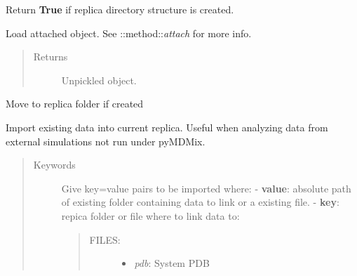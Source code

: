 \documentclass[letterpaper,10pt,english]{sphinxmanual}
\begin{document}
\begin{fulllineitems}

\begin{fulllineitems}
\label{replicas:pyMDMix.Replicas.Replica.folderscreated}
Return \textbf{True} if replica directory structure is created.

\end{fulllineitems}


\begin{fulllineitems}
\label{replicas:pyMDMix.Replicas.Replica.getAttached}
Load attached object. See ::method::\emph{attach} for more info.
\begin{quote}\begin{description}
\item[{Returns}] \leavevmode
Unpickled object.

\end{description}\end{quote}

\end{fulllineitems}


\begin{fulllineitems}
\label{replicas:pyMDMix.Replicas.Replica.go}
Move to replica folder if created

\end{fulllineitems}


\begin{fulllineitems}
\label{replicas:pyMDMix.Replicas.Replica.importData}
Import existing data into current replica. Useful when analyzing data from external simulations
not run under pyMDMix.
\begin{quote}\begin{description}
\item[{Keywords}] \leavevmode
Give key=value pairs to be imported where:
- \textbf{value}: absolute path of existing folder containing data to link or a existing file.
- \textbf{key}: repica folder or file where to link data to:
\begin{quote}
\begin{description}
\item[{FILES:}] \leavevmode\begin{itemize}
\item {} 
\emph{pdb}:       System PDB


\end{itemize}
\end{description}
\end{quote}
\end{description}
\end{quote}
\end{fulllineitems}
\end{fulllineitems}
\end{document}
